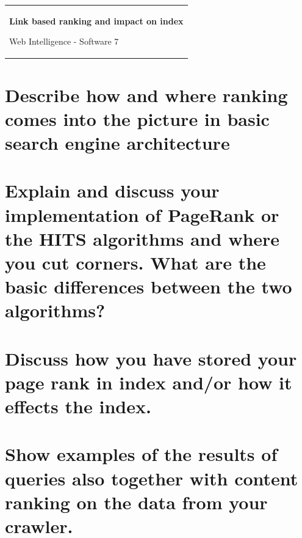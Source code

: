 \documentclass[article,10pt]{article}
\begin{document}
 \begin{tabular}{@{}p{\textwidth}@{}}
    \begin{center}
    \vspace{0.5cm} %
    \Huge{\textbf{
      Link based ranking and impact on index %
    }}
    \vspace{0.5cm} %
    \end{center}
   \begin{center}
    {\Large
      Web Intelligence - Software 7
    }
   \end{center}
   
  \end{tabular}


\section{Describe how and where ranking comes into the picture in basic search engine architecture}



\section{Explain and discuss your implementation of PageRank or the HITS algorithms and where you cut corners. What are the basic differences between the two algorithms?}



\section{Discuss how you have stored your page rank in index and/or how it effects the index.}



\section{Show examples of the results of queries also together with content ranking on the data from your crawler.}

\end{document}
